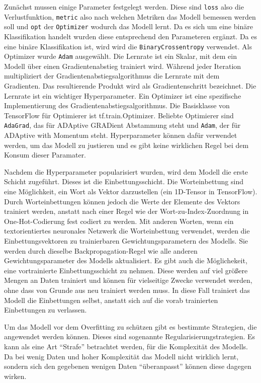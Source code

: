 Zunächst mussen einige Parameter festgelegt werden. Diese sind \texttt{loss} also die Verlustfunktion, \texttt{metric} also nach welchen Metriken das Modell bemessen werden soll und \texttt{opt} der \texttt{Optimizer} wodurch das Modell lernt. Da es sich um eine binäre Klassifikation handelt wurden diese entsprechend den Parameteren ergänzt. Da es eine binäre Klassifikation ist, wird wird die \texttt{BinaryCrossentropy} verwendet. Als Optimizer wurde \texttt{Adam} ausgewählt. Die Lernrate ist ein Skalar, mit dem ein Modell über einen Gradientenabstieg trainiert wird. Während jeder Iteration multipliziert der Gradientenabstiegsalgorithmus die Lernrate mit dem Gradienten. Das resultierende Produkt wird als Gradientenschritt bezeichnet. Die Lernrate ist ein wichtiger Hyperparameter. Ein Optimizer ist eine spezifische Implementierung des Gradientenabstiegsalgorithmus. Die Basisklasse von TensorFlow für Optimierer ist tf.train.Optimizer. Beliebte Optimierer sind \texttt{AdaGrad}, das für ADAptive GRADient Abstammung steht und \texttt{Adam}, der für ADAptive with Momentum steht. Hyperparameter können dafür verwendet werden, um das Modell zu justieren und es gibt keine wirklichen Regel bei dem Konsum dieser Paramater. 

Nachdem die Hyperparameter popularisiert wurden, wird dem Modell die erste Schicht zugeführt. Dieses ist die Einbettungsschicht. Die Worteinbettung sind eine Möglichkeit, ein Wort als Vektor darzustellen (ein 1D-Tensor in TensorFlow). Durch Worteinbettungen können jedoch die Werte der Elemente des Vektors trainiert werden, anstatt nach einer Regel wie der Wort-zu-Index-Zuordnung in One-Hot-Codierung fest codiert zu werden. Mit anderen Worten, wenn ein textorientiertes neuronales Netzwerk die Worteinbettung verwendet, werden die Einbettungsvektoren zu trainierbaren Gewichtungsparametern des Modells. Sie werden durch dieselbe Backpropagation-Regel wie alle anderen Gewichtungsparameter des Modells aktualisiert. Es gibt auch die Möglichekeit, eine vortrainierte Einbettungsschicht zu nehmen. Diese werden auf viel größere Mengen an Daten trainiert und können für vielseitige Zwecke verwendet werden, ohne dass von Grunde aus neu trainiert werden muss. In diese Fall trainiert das Modell die Einbettungen selbst, anstatt sich auf die vorab trainierten Einbettungen zu verlassen.


Um das Modell vor dem Overfitting zu schützen gibt es bestimmte Strategien, die angewendet werden können. Dieses sind sogenannte Regularisierungstrategien. Es kann als eine Art \enquote{Strafe} betrachtet werden, für die Komplexität des Modells. Da bei wenig Daten und hoher Komplexität das Modell nicht wirklich lernt, sondern sich den gegebenen wenigen Daten \enquote{überanpasst} können diese dagegen wirken. 


